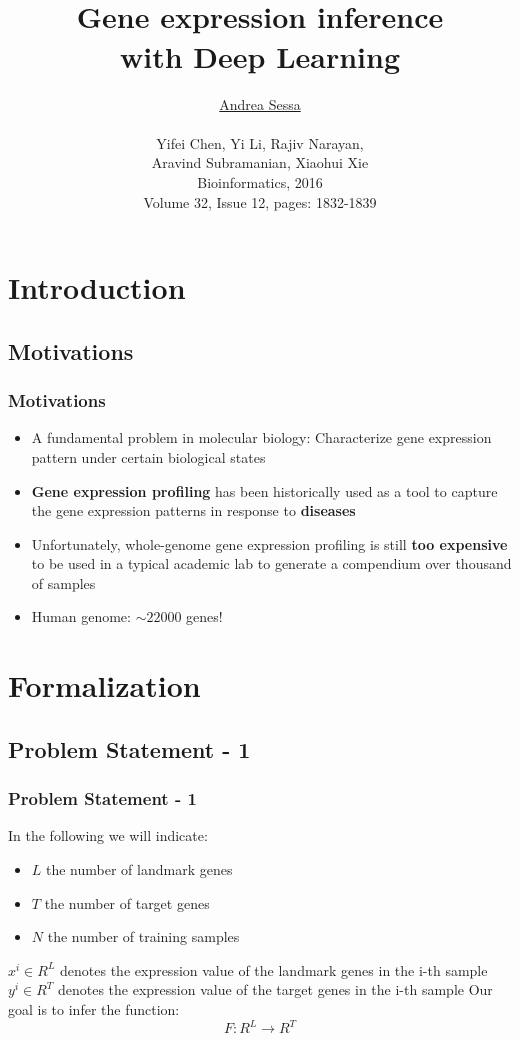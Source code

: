 \documentclass[professionalfont]{beamer}
\title[Gene expression inference with Deep Learning]{\textbf{\\Gene expression inference\\ with Deep Learning}}
\author[A. Sessa]{\underline{Andrea Sessa}\\
\vspace{2mm}
{\small \href{}{\nolinkurl{}}}\\
 \small{Yifei Chen, Yi Li, Rajiv Narayan, \\ Aravind Subramanian, Xiaohui Xie} \\
 \small{Bioinformatics, 2016 \\ Volume 32, Issue 12, pages: 1832-1839}}
\date{}
\begin{document}
  \begin{frame}[plain]
    \titlepage
  \end{frame}

  \section{Introduction}

    \subsection{Motivations}
      \begin{frame}
	\frametitle{Motivations}
	  \begin{itemize}
	   \item A fundamental problem in molecular biology: Characterize gene expression pattern under certain biological states
	   \item \textbf{Gene expression profiling} has been historically used as a tool to capture the gene expression patterns in response to \textbf{diseases}
	   \item Unfortunately, whole-genome gene expression profiling is still \textbf{too expensive} to be used in a typical academic lab to
		 generate a compendium over thousand of samples
           \item Human genome: $\sim 22000$ genes!
	  \end{itemize}
      \end{frame}

    \section{Formalization}

  \subsection{Problem Statement - 1}
	   \begin{frame}
  	 \frametitle{Problem Statement - 1}
     In the following we will indicate:
     \begin{itemize}
       \item $L$ the number of landmark genes
       \item $T$ the number of target genes
       \item $N$ the number of training samples
     \end{itemize}
     \vspace{0.5cm}
     $x^i \in R^L$ denotes the expression value of the landmark genes in the i-th sample\newline\newline
     $y^i \in R^T$ denotes the expression value of the target genes in the i-th sample
     Our goal is to infer the function:
     \begin{equation}
       F: R^L \rightarrow R^T
     \end{equation}
  	\end{frame}
\end{document}
